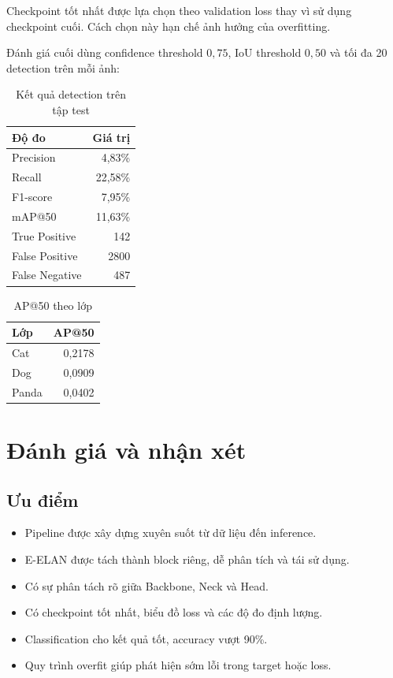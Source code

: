 \documentclass[12pt,a4paper]{article}
\begin{document}
Checkpoint tốt nhất được lựa chọn theo validation loss thay vì sử dụng checkpoint cuối. Cách chọn này hạn chế ảnh hưởng của overfitting.

Đánh giá cuối dùng confidence threshold $0,75$, IoU threshold $0,50$ và tối đa 20 detection trên mỗi ảnh:

\begin{table}[H]
\centering
\caption{Kết quả detection trên tập test}
\begin{tabular}{lr}
\toprule
\textbf{Độ đo} & \textbf{Giá trị}\\
\midrule
Precision & 4,83\%\\
Recall & 22,58\%\\
F1-score & 7,95\%\\
mAP@50 & 11,63\%\\
\midrule
True Positive & 142\\
False Positive & 2800\\
False Negative & 487\\
\bottomrule
\end{tabular}
\end{table}

\begin{table}[H]
\centering
\caption{AP@50 theo lớp}
\begin{tabular}{lr}
\toprule
\textbf{Lớp} & \textbf{AP@50}\\
\midrule
Cat & 0,2178\\
Dog & 0,0909\\
Panda & 0,0402\\
\bottomrule
\end{tabular}
\end{table}

\section{Đánh giá và nhận xét}

\subsection{Ưu điểm}
\begin{itemize}[leftmargin=*]
  \item Pipeline được xây dựng xuyên suốt từ dữ liệu đến inference.
  \item E-ELAN được tách thành block riêng, dễ phân tích và tái sử dụng.
  \item Có sự phân tách rõ giữa Backbone, Neck và Head.
  \item Có checkpoint tốt nhất, biểu đồ loss và các độ đo định lượng.
  \item Classification cho kết quả tốt, accuracy vượt 90\%.
  \item Quy trình overfit giúp phát hiện sớm lỗi trong target hoặc loss.
\end{itemize}
\end{document}

